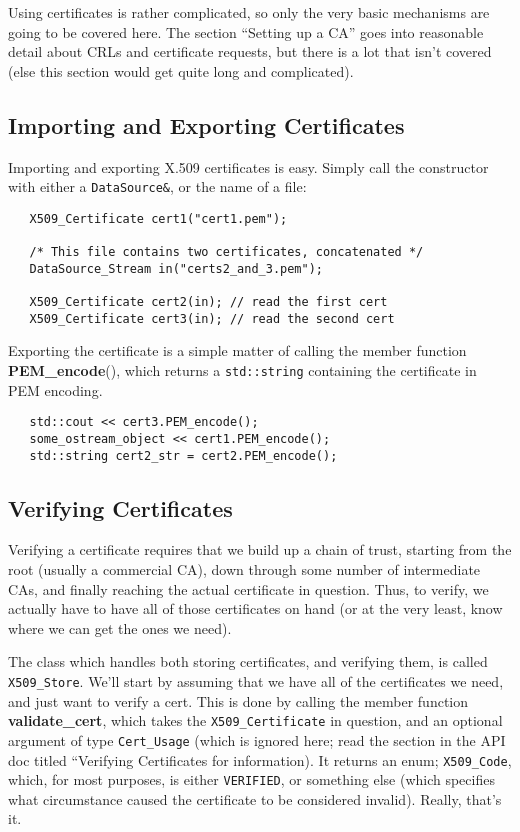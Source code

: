 \documentclass{article}
\newcommand{\function}[1]{\textbf{#1}}
\newcommand{\type}[1]{\texttt{#1}}
\begin{document}
Using certificates is rather complicated, so only the very basic mechanisms are
going to be covered here. The section ``Setting up a CA'' goes into reasonable
detail about CRLs and certificate requests, but there is a lot that isn't
covered (else this section would get quite long and complicated).

\subsection{Importing and Exporting Certificates}

Importing and exporting X.509 certificates is easy. Simply call the constructor
with either a \type{DataSource\&}, or the name of a file:

\begin{verbatim}
   X509_Certificate cert1("cert1.pem");

   /* This file contains two certificates, concatenated */
   DataSource_Stream in("certs2_and_3.pem");

   X509_Certificate cert2(in); // read the first cert
   X509_Certificate cert3(in); // read the second cert
\end{verbatim}

Exporting the certificate is a simple matter of calling the member function
\function{PEM\_encode}(), which returns a \type{std::string} containing the
certificate in PEM encoding.

\begin{verbatim}
   std::cout << cert3.PEM_encode();
   some_ostream_object << cert1.PEM_encode();
   std::string cert2_str = cert2.PEM_encode();
\end{verbatim}

\subsection{Verifying Certificates}

Verifying a certificate requires that we build up a chain of trust, starting
from the root (usually a commercial CA), down through some number of
intermediate CAs, and finally reaching the actual certificate in
question. Thus, to verify, we actually have to have all of those certificates
on hand (or at the very least, know where we can get the ones we need).

The class which handles both storing certificates, and verifying them, is
called \type{X509\_Store}. We'll start by assuming that we have all of the
certificates we need, and just want to verify a cert. This is done by calling
the member function \function{validate\_cert}, which takes the
\type{X509\_Certificate} in question, and an optional argument of type
\type{Cert\_Usage} (which is ignored here; read the section in the API doc
titled ``Verifying Certificates for information). It returns an enum;
\type{X509\_Code}, which, for most purposes, is either \type{VERIFIED}, or
something else (which specifies what circumstance caused the certificate to be
considered invalid). Really, that's it.
\end{document}
